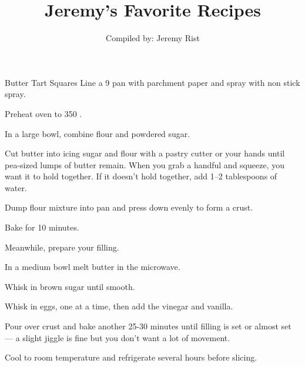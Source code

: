 \documentclass[letterpaper]{book}
\title{Jeremy's Favorite Recipes}
\author{Compiled by: Jeremy Rist}
\begin{document}
\maketitle

\begin{recipe}{Butter Tart Squares}{}{}
    \newstep
    Line a 9 pan with parchment paper and spray with non stick spray.
    
    Preheat oven to 350\0 .

    In a large bowl, combine flour and powdered sugar.

    Cut butter into icing sugar and flour with a pastry cutter or your hands until pea-sized lumps of butter remain.
    When you grab a handful and squeeze, you want it to hold together.
    If it doesn't hold together, add 1--2 tablespoons of water.

    \newstep
    Dump flour mixture into pan and press down evenly to form a crust.

    Bake for 10 minutes.

    Meanwhile, prepare your filling.

    In a medium bowl melt butter in the microwave.

    Whisk in brown sugar until smooth.

    Whisk in eggs, one at a time, then add the vinegar and vanilla.

    \newstep
    Pour over crust and bake another 25-30 minutes until filling is set or almost set --- a slight jiggle is fine but you don't want a lot of movement.

    Cool to room temperature and refrigerate several hours before slicing.
\end{recipe}
\end{document}
